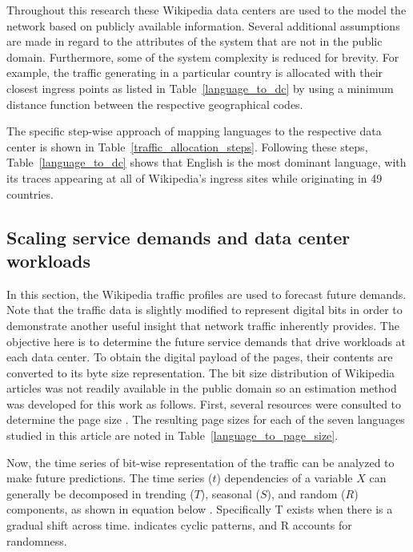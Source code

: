     
    
    Throughout this research these Wikipedia data centers are used to the model the network based on publicly available information. Several additional assumptions are made in regard to the attributes of the system that are not in the public domain. Furthermore, some of the system complexity is reduced for brevity. For example, the traffic generating in a particular country is allocated with their closest ingress points as listed in Table~\ref{language_to_dc} by using a minimum distance function between the respective geographical codes. 
    
    The specific step-wise approach of mapping languages to the respective data center is shown in Table~\ref{traffic_allocation_steps}. Following these steps, Table~\ref{language_to_dc} shows that English is the most dominant language, with its traces appearing at all of Wikipedia's ingress sites while originating in 49 countries.  
    
    
    
    \subsection{Scaling service demands and data center workloads}
    
    In this section, the Wikipedia traffic profiles are used to forecast future demands. Note that the traffic data is slightly modified to represent digital bits in order to demonstrate another useful insight that network traffic inherently provides. The objective here is to determine the future service demands that drive workloads at each data center. To obtain the digital payload of the pages, their contents are converted to its byte size representation. The bit size distribution of Wikipedia articles was not readily available in the public domain so an estimation method was developed for this work as follows. First, several resources were consulted to determine the page size \cite{wiki_stats, xtools}. The resulting page sizes for each of the seven languages studied in this article are noted in Table~\ref{language_to_page_size}. 
    
        
    
    Now, the time series of bit-wise representation of the traffic can be analyzed to make future predictions. The time series ($t$) dependencies of a variable $X$ can generally be decomposed in trending ($T$), seasonal ($S$), and random ($R$) components, as shown in equation below \cite{zhuang15}. Specifically T exists when there is a gradual shift across time. indicates cyclic patterns, and R accounts for randomness.   
    
